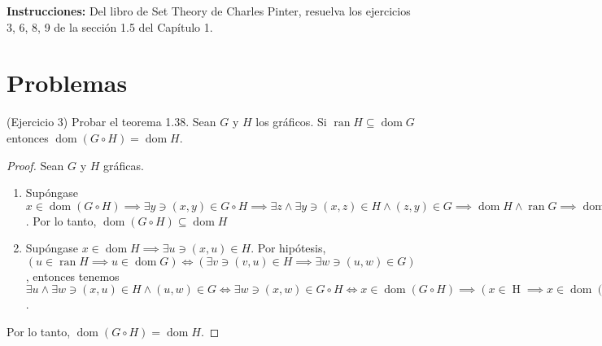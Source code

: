 




\textbf{Instrucciones:} Del libro de Set Theory de Charles Pinter, resuelva los ejercicios 3, 6, 8, 9 de la sección 1.5 del Capítulo 1.

\section{Problemas}
\begin{problema}(Ejercicio 3)
	Probar el teorema 1.38. Sean $G$ y $H$ los gráficos. Si $\operatorname{ran} H \subseteq  \operatorname{dom} G$ entonces $\operatorname{dom}(G\circ H)= \operatorname{dom} H$.
\end{problema}

\begin{proof}
	Sean $G$ y $H$ gráficas. 
	
	\begin{enumerate}
		\item[$(\implies)$] Supóngase $x\in \operatorname{dom}(G\circ H) \implies \exists y \ni (x,y)\in G\circ H\implies \exists z \wedge \exists y \ni (x,z)\in H\wedge (z,y)\in G\implies \operatorname{dom}H\wedge \operatorname{ran}G\implies \operatorname{dom}H$. Por lo tanto, $\operatorname{dom}(G\circ H)\subseteq \operatorname{dom} H$
		\item[$(\impliedby)$]  Supóngase $x\in \operatorname{dom} H\implies \exists u \ni (x,u) \in H$. Por hipótesis, $(u\in \operatorname{ran} H\implies u\in \operatorname{dom} G) \iff (\exists v \ni (v,u)\in H\implies \exists w  \ni (u,w)\in G)$,   entonces tenemos $\exists u \wedge \exists w \ni (x,u)\in H \wedge (u,w)\in G\iff \exists w\ni (x,w)\in G\circ H\iff x\in \operatorname{dom}(G\circ H)\implies (x\in \operatorname{H}\implies x\in \operatorname{dom}(G\circ H))\implies\operatorname{dom}H \subseteq  \operatorname{dom}(G\circ H)$.
	\end{enumerate}
Por lo tanto, $\operatorname{dom}(G\circ H)= \operatorname{dom} H$.
\end{proof}

